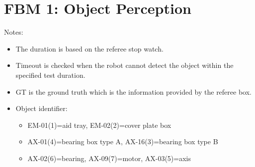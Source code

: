 \section*{FBM 1: Object Perception}


\noindent Notes:
\begin{itemize}
\item The duration is based on the referee stop watch.
\item Timeout is checked when the robot cannot detect the object within the specified test duration.
\item GT is the ground truth which is the information provided by the referee box.
\item Object identifier:
	\begin{itemize}
		\item EM-01(1)=aid tray, EM-02(2)=cover plate box
		\item AX-01(4)=bearing box type A, AX-16(3)=bearing box type B
		\item AX-02(6)=bearing, AX-09(7)=motor, AX-03(5)=axis
	\end{itemize}
\end{itemize}

\vspace{0.5cm}

\\

\newpage
{}\\
\\
\\

\newpage
{}\\
\\
\\

\newpage
{}\\
\\



